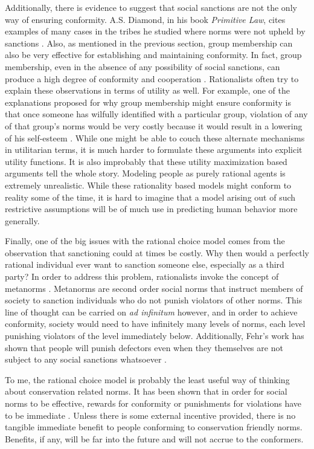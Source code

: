 \documentclass[rutwik_proposal.tex]{subfiles}
\begin{document}
Additionally, there is evidence to suggest that social sanctions are not the only way of ensuring conformity. A.S. Diamond, in his book \textit{Primitive Law}, cites examples of many cases in the tribes he studied where norms were not upheld by sanctions \cite{Diamond71}. Also, as mentioned in the previous section, group membership can also be very effective for establishing and maintaining conformity. In fact, group membership, even in the absence of any possibility of social sanctions, can produce a high degree of conformity and cooperation \cite{Kramer84}. Rationalists often try to explain these observations in terms of utility as well. For example, one of the explanations proposed for why group membership might ensure conformity is that once someone has wilfully identified with a particular group, violation of any of that group's norms would be very costly because it would result in a lowering of his self-esteem \cite{Axelrod86}. While one might be able to couch these alternate mechanisms in utilitarian terms, it is much harder to formulate these arguments into explicit utility functions. It is also improbably that these utility maximization based arguments tell the whole story. Modeling people as purely rational agents is extremely unrealistic. While these rationality based models might conform to reality some of the time, it is hard to imagine that a model arising out of such restrictive assumptions will be of much use in predicting human behavior more generally.

Finally, one of the big issues with the rational choice model comes from the observation that sanctioning could at times be costly. Why then would a perfectly rational individual ever want to sanction someone else, especially as a third party? In order to address this problem, rationalists invoke the concept of metanorms \cite{Axelrod86}. Metanorms are second order social norms that instruct members of society to sanction individuals who do not punish violators of other norms. This line of thought can be carried on \textit{ad infinitum} however, and in order to achieve conformity, society would need to have infinitely many levels of norms, each level punishing violators of the level immediately below. Additionally, Fehr's work has shown that people will punish defectors even when they themselves are not subject to any social sanctions whatsoever \cite{Fehr04}.

To me, the rational choice model is probably the least useful way of thinking about conservation related norms. It has been shown that in order for social norms to be effective, rewards for conformity or punishments for violations have to be immediate \cite{Fehr16}. Unless there is some external incentive provided, there is no tangible immediate benefit to people conforming to conservation friendly norms. Benefits, if any, will be far into the future and will not accrue to the conformers. 
\end{document}
